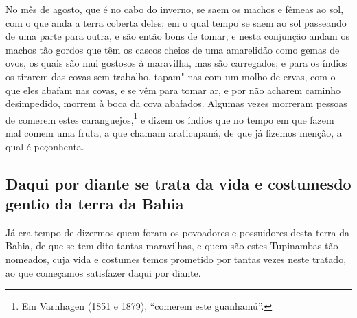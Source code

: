 No mês de agosto, que é no cabo do inverno, se saem os machos e fêmeas ao sol, com o que
anda a terra coberta deles; em o qual tempo se saem ao sol passeando de uma parte para
outra, e são então bons de tomar; e nesta conjunção andam os machos tão gordos que têm os
cascos cheios de uma amarelidão como gemas de ovos, os quais são mui gostosos à maravilha,
mas são carregados; e para os índios os tirarem das covas sem trabalho, tapam"-nas com um
molho de ervas, com o que eles abafam nas covas, e se vêm para tomar ar, e por não acharem
caminho desimpedido, morrem à boca da cova abafados. Algumas vezes morreram pessoas de
comerem estes caranguejos,\footnote{ Em Varnhagen (1851 e 1879), ``comerem este
guanhamú''.} e dizem os índios que no tempo em que fazem mal comem uma fruta, a que chamam
araticupaná, de que já fizemos menção, a qual é peçonhenta.

\subsection{Daqui por diante se trata da vida e costumes\break do gentio da terra da Bahia}

Já era tempo de dizermos quem foram os povoadores e possuidores desta terra da Bahia, de
que se tem dito tantas maravilhas, e quem são estes Tupinambas tão nomeados, cuja vida e
costumes temos prometido por tantas vezes neste tratado, ao que começamos satisfazer daqui
por diante.

